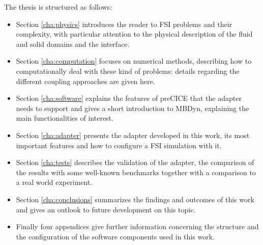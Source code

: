 The thesis is structured as follows:
\begin{itemize}
	\item Section \ref{cha:physics} introduces the reader to FSI problems and their complexity, with particular attention to the physical description of the fluid and solid domains and the interface. 
	\item Section \ref{cha:computation} focuses on numerical methods, describing how to computationally deal with these kind of problems: details regarding the different coupling approaches are given here.
	\item Section \ref{cha:software} explains the features of preCICE that the adapter needs to support and gives a short introduction to MBDyn, explaining the main functionalities of interest.
	\item Section \ref{cha:adapter} presents the adapter developed in this work, its most important features and how to configure a FSI simulation with it.
	\item Section \ref{cha:tests} describes the validation of the adapter, the comparison of the results with some well-known benchmarks together with a comparison to a real world experiment.
	\item Section \ref{cha:conclusions} summarizes the findings and outcomes of this work and gives an outlook to future development on this topic.
	\item Finally four appendices give further information concerning the structure and the configuration of the software components used in this work.   
\end{itemize} 

